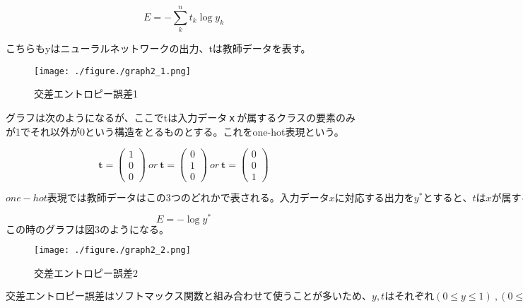 \begin{equation}
\label{交差エントロピー誤差}
E = -\sum_k^n t_k \log y_k
\end{equation}

こちらもyはニューラルネットワークの出力、tは教師データを表す。

\begin{figure}[h]
\begin{center}
\texttt{[image: ./figure./graph2\_1.png]}
\end{center}
\caption{交差エントロピー誤差1}
\end{figure}

グラフは次のようになるが、ここでtは入力データｘが属するクラスの要素のみが1でそれ以外が0という構造をとるものとする。これをone-hot表現という。

\[
  \bm{t} = \left(
    \begin{array}{c}
      1 \\
      0 \\
      0
    \end{array}
	\right)\ or\ 
\bm{t} = \left(
    \begin{array}{c}
      0 \\
      1 \\
      0
    \end{array}
  \right)\ or\ 
\bm{t} = \left(
    \begin{array}{c}
      0 \\
      0 \\
      1
    \end{array}
  \right)
\]

$one-hot表現では教師データはこの3つのどれかで表される。入力データxに対応する出力をy^*とすると、tはxが属するクラスのみ1でそれ以外が0となるため、交差エントロピー誤差の式は次のように変形できる。$

\begin{equation}
\label{交差エントロピー誤差}
E = - \log y^*
\end{equation}
$この時のグラフは図3のようになる。$

\begin{figure}[h]
\begin{center}
\texttt{[image: ./figure./graph2\_2.png]}
\end{center}
\caption{交差エントロピー誤差2}
\end{figure}

$交差エントロピー誤差はソフトマックス関数と組み合わせて使うことが多いため、y,tはそれぞれ(0\le y \le 1)\ , (0\le t \le 1)となり、確率のように扱える。交差エントロピー誤差はyがtに近い値を出力するほど値が小さくなっていく。交差エントロピー誤差の最小値はy=1、つまりy=tになる時に最小値をとる。またy=0の時は損失関数の値が∞に発散してしまうので、実装する際にはyに微小な値を足し合わせることで発散を防ぐ。$
\begin{flushright}
\bunseki{※伊藤晋之介}
\end{flushright}

